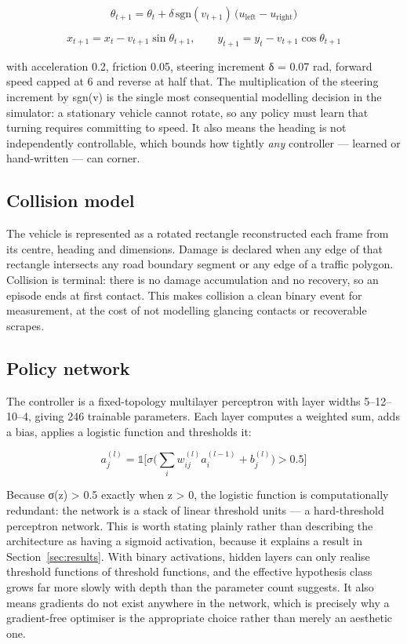 \documentclass[conference]{IEEEtran}
\begin{document}
\begin{equation}
\theta_{t+1} = \theta_t + \delta\,\mathrm{sgn}(v_{t+1})\,\big(u_{\mathrm{left}}-u_{\mathrm{right}}\big)
\end{equation}

\begin{equation}
x_{t+1} = x_t - v_{t+1}\sin\theta_{t+1}, \qquad y_{t+1} = y_t - v_{t+1}\cos\theta_{t+1}
\end{equation}

with acceleration 0.2, friction 0.05, steering increment δ = 0.07 rad, forward speed capped at 6 and reverse at half that. The multiplication of the steering increment by sgn(v) is the single most consequential modelling decision in the simulator: a stationary vehicle cannot rotate, so any policy must learn that turning requires committing to speed. It also means the heading is not independently controllable, which bounds how tightly \emph{any} controller — learned or hand-written — can corner.

\subsection{Collision model}

The vehicle is represented as a rotated rectangle reconstructed each frame from its centre, heading and dimensions. Damage is declared when any edge of that rectangle intersects any road boundary segment or any edge of a traffic polygon. Collision is terminal: there is no damage accumulation and no recovery, so an episode ends at first contact. This makes collision a clean binary event for measurement, at the cost of not modelling glancing contacts or recoverable scrapes.

\subsection{Policy network}

The controller is a fixed-topology multilayer perceptron with layer widths 5–12–10–4, giving 246 trainable parameters. Each layer computes a weighted sum, adds a bias, applies a logistic function and thresholds it:

\begin{equation}
a^{(l)}_j = \mathbb{1}\Big[\sigma\Big(\textstyle\sum_i w^{(l)}_{ij} a^{(l-1)}_i + b^{(l)}_j\Big) > 0.5\Big]
\end{equation}

Because σ(z) > 0.5 exactly when z > 0, the logistic function is computationally redundant: the network is a stack of linear threshold units — a hard-threshold perceptron network. This is worth stating plainly rather than describing the architecture as having a sigmoid activation, because it explains a result in Section~\ref{sec:results}. With binary activations, hidden layers can only realise threshold functions of threshold functions, and the effective hypothesis class grows far more slowly with depth than the parameter count suggests. It also means gradients do not exist anywhere in the network, which is precisely why a gradient-free optimiser is the appropriate choice rather than merely an aesthetic one.
\end{document}
